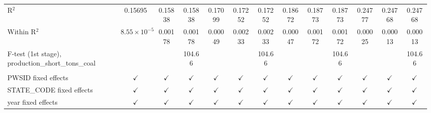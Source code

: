 \begin{table}[htbp]
\begin{adjustbox}{width = \textwidth, center}
\begin{tabular}{lcccccccccccc}
         R$^2$                                                & 0.15695               & 0.15838        & 0.15838               & 0.17099               & 0.17252        & 0.17252               & 0.18672               & 0.18773       & 0.18773               & 0.24777               & 0.24768       & 0.24768\\  
         Within R$^2$                                         & $8.55\times 10^{-5}$  & 0.00178        & 0.00178               & 0.00049               & 0.00233        & 0.00233               & 0.00047               & 0.00172       & 0.00172               & 0.00025               & 0.00013       & 0.00013\\  
         F-test (1st stage), production\_short\_tons\_coal    &                       &                & 104.66                &                       &                & 104.66                &                       &               & 104.66                &                       &               & 104.66\\  
          \\
         PWSID fixed effects                                  & $\checkmark$          & $\checkmark$   & $\checkmark$          & $\checkmark$          & $\checkmark$   & $\checkmark$          & $\checkmark$          & $\checkmark$  & $\checkmark$          & $\checkmark$          & $\checkmark$  & $\checkmark$\\   
         STATE\_CODE fixed effects                            & $\checkmark$          & $\checkmark$   & $\checkmark$          & $\checkmark$          & $\checkmark$   & $\checkmark$          & $\checkmark$          & $\checkmark$  & $\checkmark$          & $\checkmark$          & $\checkmark$  & $\checkmark$\\   
         year fixed effects                                   & $\checkmark$          & $\checkmark$   & $\checkmark$          & $\checkmark$          & $\checkmark$   & $\checkmark$          & $\checkmark$          & $\checkmark$  & $\checkmark$          & $\checkmark$          & $\checkmark$  & $\checkmark$\\   
         \bottomrule
      \end{tabular}
   \end{adjustbox}
\end{table}


